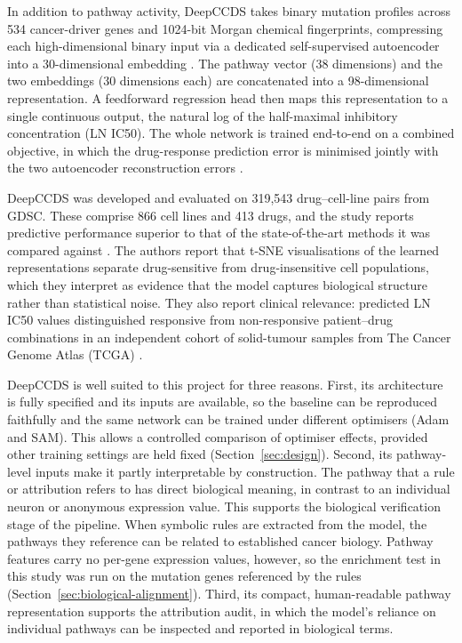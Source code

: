 In addition to pathway activity, DeepCCDS takes binary mutation profiles across 534 cancer-driver genes and 1024-bit Morgan chemical fingerprints, compressing each high-dimensional binary input via a dedicated self-supervised autoencoder into a 30-dimensional embedding \citep{wu2025}. The pathway vector (38 dimensions) and the two embeddings (30 dimensions each) are concatenated into a 98-dimensional representation. A feedforward regression head then maps this representation to a single continuous output, the natural log of the half-maximal inhibitory concentration (LN IC50). The whole network is trained end-to-end on a combined objective, in which the drug-response prediction error is minimised jointly with the two autoencoder reconstruction errors \citep{wu2025}.

DeepCCDS was developed and evaluated on 319,543 drug--cell-line pairs from GDSC. These comprise 866 cell lines and 413 drugs, and the study reports predictive performance superior to that of the state-of-the-art methods it was compared against \citep{wu2025}. The authors report that t-SNE visualisations of the learned representations separate drug-sensitive from drug-insensitive cell populations, which they interpret as evidence that the model captures biological structure rather than statistical noise. They also report clinical relevance: predicted LN IC50 values distinguished responsive from non-responsive patient--drug combinations in an independent cohort of solid-tumour samples from The Cancer Genome Atlas (TCGA) \citep{wu2025}.

DeepCCDS is well suited to this project for three reasons. First, its architecture is fully specified and its inputs are available, so the baseline can be reproduced faithfully and the same network can be trained under different optimisers (Adam and SAM). This allows a controlled comparison of optimiser effects, provided other training settings are held fixed (Section~\ref{sec:design}). Second, its pathway-level inputs make it partly interpretable by construction. The pathway that a rule or attribution refers to has direct biological meaning, in contrast to an individual neuron or anonymous expression value. This supports the biological verification stage of the pipeline. When symbolic rules are extracted from the model, the pathways they reference can be related to established cancer biology. Pathway features carry no per-gene expression values, however, so the enrichment test in this study was run on the mutation genes referenced by the rules (Section~\ref{sec:biological-alignment}). Third, its compact, human-readable pathway representation supports the attribution audit, in which the model's reliance on individual pathways can be inspected and reported in biological terms.


